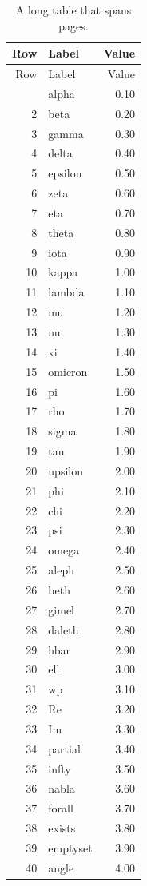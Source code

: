 \documentclass[11pt]{article}
\begin{document}
\begin{longtable}{rlr}
  \caption{A long table that spans pages.}\label{tab:long} \\
  \toprule
  Row & Label & Value \\
  \midrule
  \endfirsthead
  \toprule
  Row & Label & Value \\
  \midrule
  \endhead
  \bottomrule
  \endfoot
  1 & alpha & 0.10 \\ 2 & beta & 0.20 \\ 3 & gamma & 0.30 \\ 4 & delta & 0.40 \\ 5 & epsilon & 0.50 \\
  6 & zeta & 0.60 \\ 7 & eta & 0.70 \\ 8 & theta & 0.80 \\ 9 & iota & 0.90 \\ 10 & kappa & 1.00 \\
  11 & lambda & 1.10 \\ 12 & mu & 1.20 \\ 13 & nu & 1.30 \\ 14 & xi & 1.40 \\ 15 & omicron & 1.50 \\
  16 & pi & 1.60 \\ 17 & rho & 1.70 \\ 18 & sigma & 1.80 \\ 19 & tau & 1.90 \\ 20 & upsilon & 2.00 \\
  21 & phi & 2.10 \\ 22 & chi & 2.20 \\ 23 & psi & 2.30 \\ 24 & omega & 2.40 \\ 25 & aleph & 2.50 \\
  26 & beth & 2.60 \\ 27 & gimel & 2.70 \\ 28 & daleth & 2.80 \\ 29 & hbar & 2.90 \\ 30 & ell & 3.00 \\
  31 & wp & 3.10 \\ 32 & Re & 3.20 \\ 33 & Im & 3.30 \\ 34 & partial & 3.40 \\ 35 & infty & 3.50 \\
  36 & nabla & 3.60 \\ 37 & forall & 3.70 \\ 38 & exists & 3.80 \\ 39 & emptyset & 3.90 \\ 40 & angle & 4.00 \\

\end{longtable}
\end{document}
